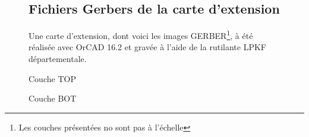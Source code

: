 \begin{figure}[hbtp]
\subsection{Fichiers Gerbers de la carte d'extension}
Une carte d'extension, dont voici les images GERBER\footnote{Les couches présentées no sont pas à l'échelle}, à été réalisée avec OrCAD 16.2 et gravée à l'aide de la rutilante LPKF départementale.
\caption{Couche TOP}
\centering
{}

\bigskip
\bigskip
\bigskip
\bigskip
\bigskip

\caption{Couche BOT}
\end{figure}


